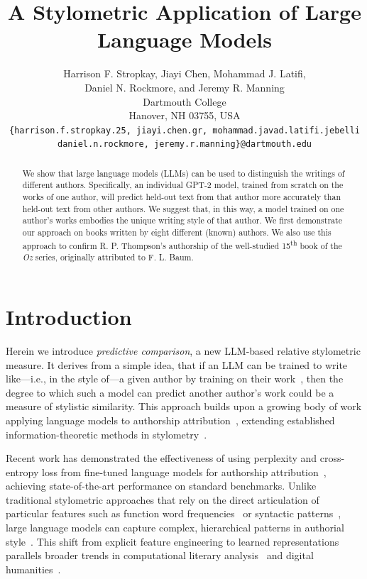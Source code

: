 \documentclass[11pt]{article}
\title{A Stylometric Application of Large Language Models}
\author{Harrison F. Stropkay, Jiayi Chen, Mohammad J. Latifi,\\
Daniel N. Rockmore, and Jeremy R. Manning\\
Dartmouth College \\
Hanover, NH 03755, USA \\
\texttt{\{harrison.f.stropkay.25, jiayi.chen.gr, mohammad.javad.latifi.jebelli}\\\texttt{daniel.n.rockmore, jeremy.r.manning\}@dartmouth.edu}}
\date{} %
\begin{document}
\maketitle

\begin{abstract}

We show that large language models (LLMs) can be used to distinguish the
writings of different authors. Specifically, an individual GPT-2 model, trained
from scratch on the works of one author, will predict held-out text from that
author more accurately than held-out text from other authors. We suggest that,
in this way, a model trained on one author's works embodies the unique writing
style of that author. We first demonstrate our approach on books written by
eight different (known) authors. We also use this approach to confirm R. P.
Thompson's authorship of the well-studied 15\textsuperscript{th} book of the
\textit{Oz} series, originally attributed to F. L. Baum.

\end{abstract}

\section{Introduction}

Herein we introduce {\em predictive comparison}, a new LLM-based relative
stylometric measure. It derives from a simple idea, that if an LLM can be
trained to write like---i.e., in the style of---a given author by training on
their work~\citep[e.g., ][]{Mikr25}, then the degree to which such a model can
predict another author's work could be a measure of stylistic similarity. This
approach builds upon a growing body of work applying language models to
authorship attribution~\citep{HuanEtal25,UcheEtal20}, extending established
information-theoretic methods in stylometry~\citep{JuolBaay05,ZhaoEtal06}.

Recent work has demonstrated the effectiveness of using perplexity and
cross-entropy loss from fine-tuned language models for authorship
attribution~\citep{HuanEtal25}, achieving state-of-the-art performance on
standard benchmarks. Unlike traditional stylometric approaches that rely on the
direct articulation of particular features such as function word
frequencies~\citep{MostWall63} or syntactic patterns~\citep{Holm98}, large
language models can capture complex, hierarchical patterns in authorial
style~\citep{FabiEtal20}. This shift from explicit feature engineering to
learned representations parallels broader trends in computational literary
analysis~\citep{More00,UndeEtal19} and digital humanities~\citep{HughEtal12}.
\end{document}
